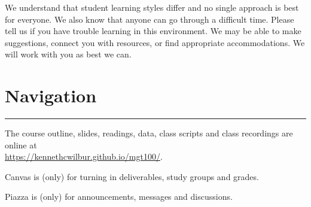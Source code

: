 \documentclass[12pt]{article}
\begin{document}
We understand that student learning styles differ and no single approach is best for everyone. We also know that anyone can go through a difficult time. Please tell us if you have trouble learning in this environment. We may be able to make suggestions, connect you with resources, or find appropriate accommodations. We will work with you as best we can.

\vspace{0.2cm}


\section*{Navigation}
\medskip
\hrule
\medskip







The course outline, slides, readings, data, class scripts and class recordings are online at \\ \textcolor{blue}{\href{https://kennethcwilbur.github.io/mgt100/}{https://kennethcwilbur.github.io/mgt100/}}. 


Canvas is (only) for turning in deliverables, study groups and grades. 

Piazza is (only) for announcements, messages and discussions.

\end{document}

